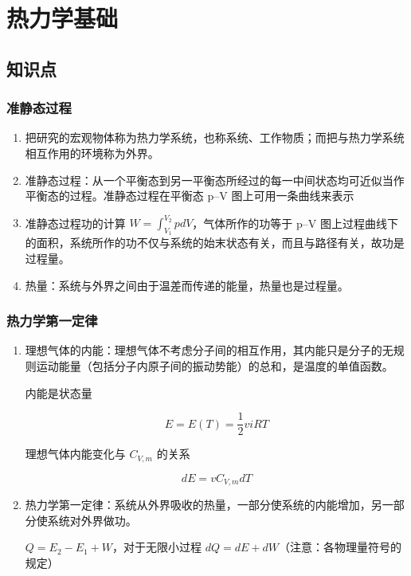 \chapter{热力学基础}

\section{知识点}

\subsection{准静态过程}

\begin{enumerate}
    \item 把研究的宏观物体称为热力学系统，也称系统、工作物质；而把与热力学系统相互作用的环境称为外界。
    \item 准静态过程：从一个平衡态到另一平衡态所经过的每一中间状态均可近似当作平衡态的过程。准静态过程在平衡态 p–V 图上可用一条曲线来表示
    \item 准静态过程功的计算 $ W = \int_{V_1}^{V_2}{pdV} $，气体所作的功等于 p–V 图上过程曲线下的面积，系统所作的功不仅与系统的始末状态有关，而且与路径有关，故功是过程量。
    \item 热量：系统与外界之间由于温差而传递的能量，热量也是过程量。
\end{enumerate}

\subsection{热力学第一定律}

\begin{enumerate}
    \item 理想气体的内能：理想气体不考虑分子间的相互作用，其内能只是分子的无规则运动能量（包括分子内原子间的振动势能）的总和，是温度的单值函数。
    
    内能是状态量 
    
    $$ E = E(T) = \frac{1}{2} v i R T $$
    
    理想气体内能变化与 $ C_{V, m} $ 的关系
    
    $$ dE = v C_{V, m} d T $$
    
    \item  热力学第一定律：系统从外界吸收的热量，一部分使系统的内能增加，另一部分使系统对外界做功。
    
    $ Q = E_2 - E_1 + W $，对于无限小过程 $dQ = dE + dW$（注意：各物理量符号的规定）
    
\end{enumerate}

